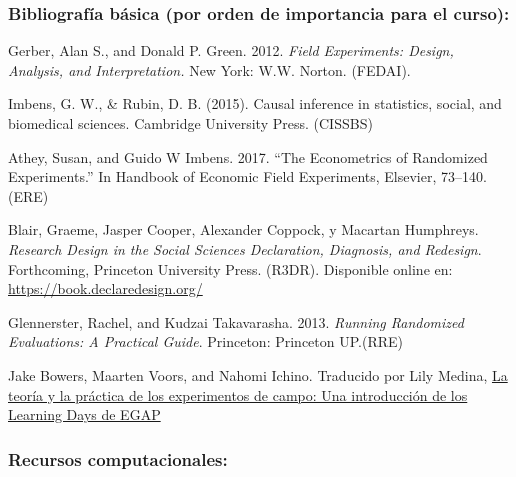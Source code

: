\documentclass[
  12pt,
]{article}
\begin{document}
\hypertarget{bibliografuxeda-buxe1sica-por-orden-de-importancia-para-el-curso}{%
\subsubsection{Bibliografía básica (por orden de importancia para el
curso):}\label{bibliografuxeda-buxe1sica-por-orden-de-importancia-para-el-curso}}

Gerber, Alan S., and Donald P. Green. 2012. \emph{Field Experiments:
Design, Analysis, and Interpretation.} New York: W.W. Norton. (FEDAI).

Imbens, G. W., \& Rubin, D. B. (2015). Causal inference in statistics,
social, and biomedical sciences. Cambridge University Press. (CISSBS)

Athey, Susan, and Guido W Imbens. 2017. ``The Econometrics of Randomized
Experiments.'' In Handbook of Economic Field Experiments, Elsevier,
73--140. (ERE)

Blair, Graeme, Jasper Cooper, Alexander Coppock, y Macartan Humphreys.
\emph{Research Design in the Social Sciences Declaration, Diagnosis, and
Redesign}. Forthcoming, Princeton University Press. (R3DR). Disponible
online en: \url{https://book.declaredesign.org/}

Glennerster, Rachel, and Kudzai Takavarasha. 2013. \emph{Running
Randomized Evaluations: A Practical Guide}. Princeton: Princeton
UP.(RRE)

Jake Bowers, Maarten Voors, and Nahomi Ichino. Traducido por Lily
Medina,
\href{https://lilymedina.github.io/theory_and_practice_of_field_experiments/}{La
teoría y la práctica de los experimentos de campo: Una introducción de
los Learning Days de EGAP}

\hypertarget{recursos-computacionales}{%
\subsubsection{Recursos
computacionales:}\label{recursos-computacionales}}
\end{document}
